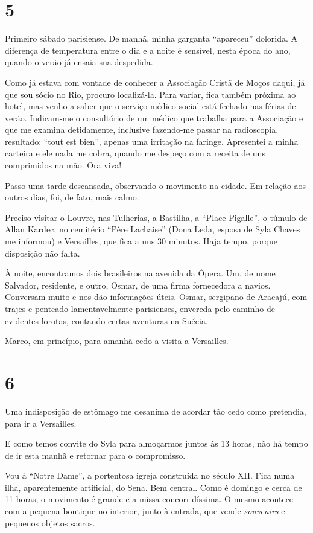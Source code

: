 \section*{5 \adfflatleafright {}}
Primeiro sábado parisiense. De manhã, minha garganta ``apareceu'' dolorida. A diferença de temperatura entre o dia e a noite é sensível, nesta época do ano, quando o verão já ensaia sua despedida.

Como já estava com vontade de conhecer a Associação Cristã de Moços daqui, já que sou sócio no Rio, procuro localizá-la. Para variar, fica também próxima ao hotel, mas venho a saber que o serviço médico-social está fechado nas férias de verão. Indicam-me o consultório de um médico que trabalha para a Associação e que me examina detidamente, inclusive fazendo-me passar na radioscopia. resultado: ``tout est bien'', apenas uma irritação na faringe. Apresentei a minha carteira e ele nada me cobra, quando me despeço com a receita de uns comprimidos na mão. Ora viva!

Passo uma tarde descansada, observando o movimento na cidade. Em relação aos outros dias, foi, de fato, mais calmo.

Preciso visitar o Louvre, nas Tulherias, a Bastilha, a ``Place Pigalle'', o túmulo de Allan Kardec, no cemitério ``Père Lachaise'' (Dona Leda, esposa de Syla Chaves me informou) e Versailles, que fica a uns 30 minutos. Haja tempo, porque disposição não falta.

À noite, encontramos dois brasileiros na avenida da Ópera. Um, de nome Salvador, residente, e outro, Osmar, de uma firma fornecedora a navios. Conversam muito e nos dão informações úteis. Osmar, sergipano de Aracajú, com trajes e penteado lamentavelmente parisienses, envereda pelo caminho de evidentes lorotas, contando certas aventuras na Suécia.

Marco, em princípio, para amanhã cedo a visita a Versailles.

\section*{6 \adfflatleafright {}}
Uma indisposição de estômago me desanima de acordar tão cedo como pretendia, para ir a Versailles.

E como temos convite do Syla para almoçarmos juntos às 13 horas, não há tempo de ir esta manhã e retornar para o compromisso.

Vou à ``Notre Dame'', a portentosa igreja construída no século XII. Fica numa ilha, aparentemente artificial, do Sena. Bem central. Como é domingo e cerca de 11 horas, o movimento é grande e a missa concorridíssima. O mesmo acontece com a pequena boutique no interior, junto à entrada, que vende \textit{souvenirs} e pequenos objetos sacros.


